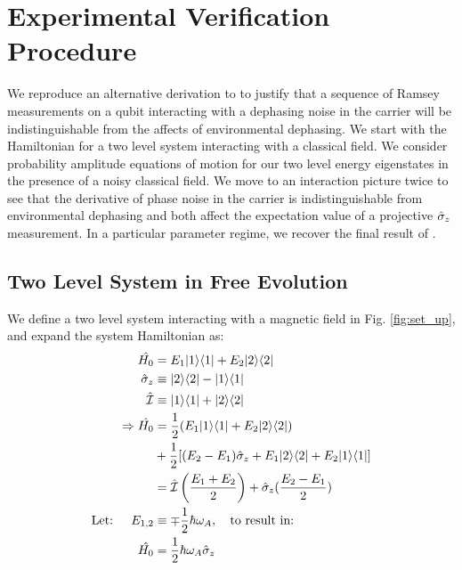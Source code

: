 
\section{Experimental Verification Procedure \label{sec:app:exptverfication}}

We reproduce an alternative derivation to \cite{soare} to justify that a sequence of Ramsey measurements on a qubit interacting with a dephasing noise in the carrier will be indistinguishable from the affects of environmental dephasing. We start with the Hamiltonian for a two level system interacting with a classical field. We consider probability amplitude equations of motion for our two level energy eigenstates in the presence of a noisy classical field. We move to an interaction picture twice to see that the derivative of phase noise in the carrier is indistinguishable from environmental dephasing and both affect the expectation value of a projective $\hat{\sigma}_{z}$ measurement. In a particular parameter regime, we recover the final result of \cite{soare}. 

\subsection{Two Level System in Free Evolution}

We define a two level system interacting with a magnetic field in Fig. \ref{fig:set_up}, and expand the system Hamiltonian as: 
\\
\begin{align}
\hat{H_0} &= E_1| 1 \rangle\langle 1 | + E_2| 2 \rangle\langle 2 | \\
\hat{\sigma}_{z} &\equiv | 2 \rangle\langle 2 | - | 1 \rangle\langle 1 | \\
\hat{\mathcal{I}} & \equiv | 1 \rangle\langle 1 | + | 2 \rangle\langle 2 | \\
\Rightarrow \hat{H_0} & = \frac{1}{2} (E_1| 1 \rangle\langle 1 |+ E_2| 2 \rangle\langle 2 |) \\
& + \frac{1}{2} [(E_2 - E_1)\hat{\sigma}_{z} + E_1 | 2 \rangle\langle 2 | + E_2 | 1 \rangle\langle 1 |]\\
& = \hat{\mathcal{I}} \left( \frac{E_1 + E_2}{2} \right) + \hat{\sigma}_{z}(\frac{E_2 - E_1}{2}) \\
\text{Let: } \quad E_{1,2} &\equiv \mp \frac{1}{2} \hbar \omega_A, \quad \text{to result in:} \\
\hat{H_0} &= \frac{1}{2} \hbar \omega_A \hat{\sigma}_{z}
\end{align}
\\
\\
